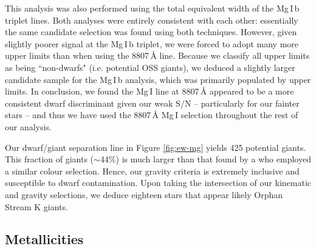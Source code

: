 \documentclass[10pt,apjl]{emulateapj}
\begin{document}
This analysis was also performed using the total equivalent width of the Mg\,\textsc{I}\,b triplet lines. Both analyses were entirely consistent with each other: essentially the same candidate selection was found using both techniques. However, given slightly poorer signal at the Mg\,\textsc{I}\,b triplet, we were forced to adopt many more upper limits than when using the 8807\,{\AA} line. Because we classify all upper limits as being ``non-dwarfs" (i.e. potential OSS giants), we deduced a slightly larger candidate sample for the Mg\,\textsc{I}\,b analysis, which was primarily populated by upper limits. In conclusion, we found the Mg\,\textsc{I} line at 8807\,{\AA} appeared to be a more consistent dwarf discriminant given our weak S/N \--- particularly for our fainter stars \--- and thus we have used the 8807\,{\AA} Mg\,\textsc{I} selection throughout the rest of our analysis.

Our dwarf/giant separation line in Figure \ref{fig:ew-mg} yields 425 potential giants. This fraction of giants ($\sim$44\%) is much larger than that found by \citeauthor{Casey_et-al_2012} \citeyear{Casey_et-al_2012}a who employed a similar colour selection. Hence, our gravity criteria is extremely inclusive and susceptible to dwarf contamination. Upon taking the intersection of our kinematic and gravity selections, we deduce eighteen stars that appear likely Orphan Stream K giants.


\subsection{Metallicities}
\label{sec:metallicities}
\end{document}
